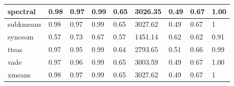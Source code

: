 \begin{table}[H]
\begin{tabular}{|l|l|l|l|l|l|l|l|l|}
\hline
spectral & 0.98 & 0.97 & 0.99 & 0.65 & 3026.35 & 0.49 & 0.67 & 1.00 \\
\hline
subkmeans & 0.98 & 0.97 & 0.99 & 0.65 & 3027.62 & 0.49 & 0.67 & 1 \\
\hline
syncsom & 0.57 & 0.73 & 0.67 & 0.57 & 1451.14 & 0.62 & 0.62 & 0.91 \\
\hline
ttsas & 0.97 & 0.95 & 0.99 & 0.64 & 2793.65 & 0.51 & 0.66 & 0.99 \\
\hline
vade & 0.97 & 0.96 & 0.99 & 0.65 & 3003.59 & 0.49 & 0.67 & 1.00 \\
\hline
xmeans & 0.98 & 0.97 & 0.99 & 0.65 & 3027.62 & 0.49 & 0.67 & 1 \\
\hline
\end{tabular}
\end{table}



